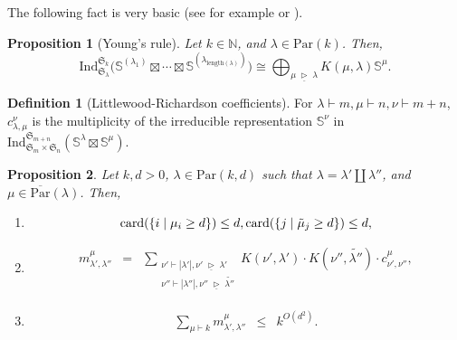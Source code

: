\documentclass{amsart}
\newtheorem{proposition}{Proposition}
\theoremstyle{definition}
\newtheorem{definition}{Definition}
\theoremstyle{remark}
\numberwithin{equation}{section}
\begin{document}
The following fact is very basic  (see for example \cite[Theorem 3.6.11]{Ceccherini-book} or \cite[page 541, Section 7.3]{Procesi-book}).

\begin{proposition}[Young's rule]
\label{prop:Young}
Let $k \in {\mathbb{N}}$, and $\lambda\in {\mathrm{Par}}(k)$. Then,
\[
{\mathrm{Ind}}_{\mathfrak{S}_\lambda}^{\mathfrak{S}_k} \big(\mathbb{S}^{(\lambda_1)}\boxtimes \cdots \boxtimes \mathbb{S}^{(\lambda_{{\mathrm{length}}(\lambda)})} \big) \cong \bigoplus_{\mu {{\;\underline{\triangleright}\;}}  \lambda} K(\mu,\lambda) \mathbb{S}^{\mu}.
\]
\end{proposition}

\begin{definition}[Littlewood-Richardson coefficients]
\label{def:LR}
For $\lambda \vdash m, \mu \vdash n, \nu \vdash m+n$, $c^\nu_{\lambda,\mu}$ is the multiplicity
of the irreducible representation $\mathbb{S}^\nu$ in 
${\mathrm{Ind}}_{\mathfrak{S}_m \times \mathfrak{S}_n}^{\mathfrak{S}_{m+n}}(\mathbb{S}^\lambda \boxtimes \mathbb{S}^\mu)$.
\end{definition}

\begin{proposition}
\label{prop:multiplicity}
Let $k,d > 0$, $\lambda \in {\mathrm{Par}}(k,d)$
such that $\lambda = \lambda' \coprod \lambda''$,
and $\mu  \in \overline{\mathrm{Par}}(\lambda)$.
Then,
\begin{enumerate}
\item
\label{item:prop:multiplicity1}
\[
{\mathrm{card}}(\{ i \mid \mu_i \geq d \}) \leq d, \\
{\mathrm{card}}(\{j \mid \tilde{\mu}_j \geq d\}) \leq d,
\]
\item
\label{item:prop:multiplicity2}
\begin{eqnarray}
\label{eqn:prop:multiplicity2}
m^\mu_{\lambda',\lambda''} &=& 
\sum_{ \substack{\nu' \vdash |\lambda'|,\nu' {{\;\underline{\triangleright}\;}} \lambda' \\ \nu'' \vdash |\lambda''|,\nu'' {{\;\underline{\triangleright}\;}} \widetilde{\lambda''}}} K(\nu',\lambda')\cdot K(\nu'',\widetilde{\lambda''})\cdot c^{\mu}_{\nu',\nu''},
\end{eqnarray}
\item
\label{item:prop:multiplicity3}
\begin{eqnarray*}
\label{eqn:prop:multiplicity3}
\sum_{\mu \vdash k} m^\mu_{\lambda',\lambda''}&\leq& 
k^{O(d^2)}.
\end{eqnarray*}
\end{enumerate}
\end{proposition}
\end{document}
